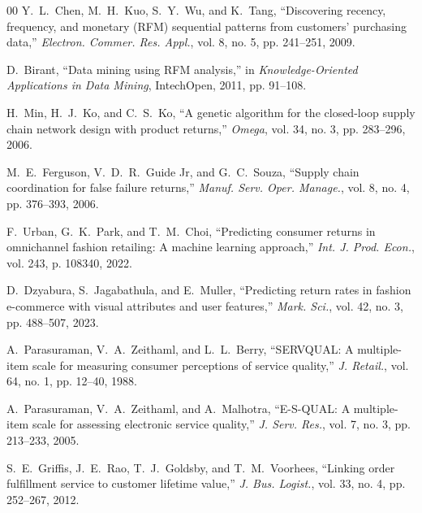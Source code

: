 \documentclass[conference]{IEEEtran}
\begin{document}
\begin{thebibliography}{00}
Y.~L.~Chen, M.~H.~Kuo, S.~Y.~Wu, and K.~Tang, ``Discovering recency, frequency, and monetary (RFM) sequential patterns from customers' purchasing data,'' \emph{Electron. Commer. Res. Appl.}, vol. 8, no. 5, pp. 241--251, 2009.

D.~Birant, ``Data mining using RFM analysis,'' in \emph{Knowledge-Oriented Applications in Data Mining}, IntechOpen, 2011, pp. 91--108.

H.~Min, H.~J.~Ko, and C.~S.~Ko, ``A genetic algorithm for the closed-loop supply chain network design with product returns,'' \emph{Omega}, vol. 34, no. 3, pp. 283--296, 2006.

M.~E.~Ferguson, V.~D.~R.~Guide Jr, and G.~C.~Souza, ``Supply chain coordination for false failure returns,'' \emph{Manuf. Serv. Oper. Manage.}, vol. 8, no. 4, pp. 376--393, 2006.

F.~Urban, G.~K.~Park, and T.~M.~Choi, ``Predicting consumer returns in omnichannel fashion retailing: A machine learning approach,'' \emph{Int. J. Prod. Econ.}, vol. 243, p. 108340, 2022.

D.~Dzyabura, S.~Jagabathula, and E.~Muller, ``Predicting return rates in fashion e-commerce with visual attributes and user features,'' \emph{Mark. Sci.}, vol. 42, no. 3, pp. 488--507, 2023.

A.~Parasuraman, V.~A.~Zeithaml, and L.~L.~Berry, ``SERVQUAL: A multiple-item scale for measuring consumer perceptions of service quality,'' \emph{J. Retail.}, vol. 64, no. 1, pp. 12--40, 1988.

A.~Parasuraman, V.~A.~Zeithaml, and A.~Malhotra, ``E-S-QUAL: A multiple-item scale for assessing electronic service quality,'' \emph{J. Serv. Res.}, vol. 7, no. 3, pp. 213--233, 2005.

S.~E.~Griffis, J.~E.~Rao, T.~J.~Goldsby, and T.~M.~Voorhees, ``Linking order fulfillment service to customer lifetime value,'' \emph{J. Bus. Logist.}, vol. 33, no. 4, pp. 252--267, 2012.

\end{thebibliography}
\end{document}
